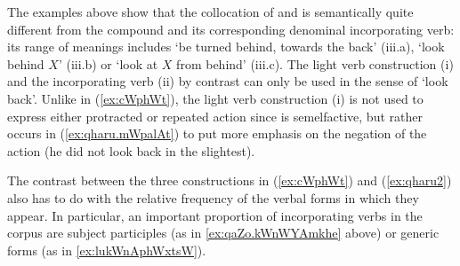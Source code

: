 The examples above show that the collocation of  and  is semantically quite different from the compound    and its corresponding denominal incorporating verb: its range of meanings includes `be turned behind, towards the back' (iii.a), `look behind $X$' (iii.b) or `look at $X$ from behind' (iii.c). The light verb construction (i) and the incorporating verb (ii) by contrast can only be used in the sense of `look back'. Unlike in (\ref{ex:cWphWt}), the light verb construction (i) is not used to express either protracted or repeated action since   is semelfactive, but rather  occurs in (\ref{ex:qharu.mWpalAt}) to put more emphasis on the negation of the action (he did not look back in the slightest).


The contrast between the three constructions in (\ref{ex:cWphWt}) and (\ref{ex:qharu2}) also has to do with the relative frequency of the verbal forms in which they appear. In particular, an important proportion of incorporating verbs in the corpus are subject participles (as in \ref{ex:qaZo.kWnWYAmkhe} above) or generic forms (as in \ref{ex:lukWnAphWxtsW}).


